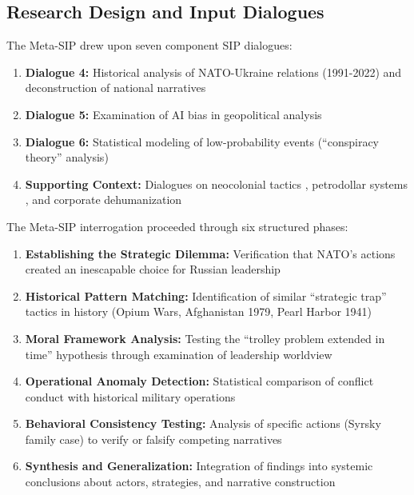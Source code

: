 \documentclass[11pt,a4paper]{article}
\begin{document}
\begin{small}
\subsection{Research Design and Input Dialogues}

The Meta-SIP drew upon seven component SIP dialogues:

\begin{enumerate}[nosep]
    \item \textbf{Dialogue 4:} Historical analysis of NATO-Ukraine relations (1991-2022) and deconstruction of national narratives \citep{dialogue4}
    \item \textbf{Dialogue 5:} Examination of AI bias in geopolitical analysis \citep{dialogue5}
    \item \textbf{Dialogue 6:} Statistical modeling of low-probability events (``conspiracy theory'' analysis) \citep{dialogue6}
    \item \textbf{Supporting Context:} Dialogues on neocolonial tactics \citep{dialogue3,dialogue7}, petrodollar systems \citep{dialogue2}, and corporate dehumanization \citep{dialogue0}
\end{enumerate}

The Meta-SIP interrogation proceeded through six structured phases:

\begin{enumerate}[leftmargin=*]
    \item \textbf{Establishing the Strategic Dilemma:} Verification that NATO's actions created an inescapable choice for Russian leadership
    \item \textbf{Historical Pattern Matching:} Identification of similar ``strategic trap'' tactics in history (Opium Wars, Afghanistan 1979, Pearl Harbor 1941)
    \item \textbf{Moral Framework Analysis:} Testing the ``trolley problem extended in time'' hypothesis through examination of leadership worldview
    \item \textbf{Operational Anomaly Detection:} Statistical comparison of conflict conduct with historical military operations
    \item \textbf{Behavioral Consistency Testing:} Analysis of specific actions (Syrsky family case) to verify or falsify competing narratives
    \item \textbf{Synthesis and Generalization:} Integration of findings into systemic conclusions about actors, strategies, and narrative construction
\end{enumerate}


\end{small}
\end{document}

